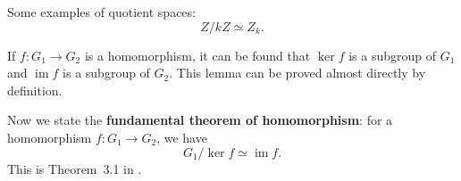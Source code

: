 \documentclass[hyperref, a4paper]{article}
\DeclareMathOperator{\im}{im}
\newcommand*{\concept}[1]{{\textbf{#1}}}
\def\mathbb#1{#1}%
\begin{document}
Some examples of quotient spaces:
\begin{equation}
    \mathbb{Z} / k \mathbb{Z} \simeq \mathbb{Z}_k.
\end{equation}

If $f: G_1 \to G_2$ is a homomorphism, it can be found that $\ker f$ is a subgroup of $G_1$ and $\im f$ is a subgroup 
of $G_2$. This lemma can be proved almost directly by definition.

Now we state the \concept{fundamental theorem of homomorphism}: for a homomorphism $f: G_1 \to G_2$, we have 
\begin{equation}
    G_1 / \ker f \simeq \im f.
\end{equation}
This is Theorem~3.1 in \cite{nakahara}. 




 
\end{document}
